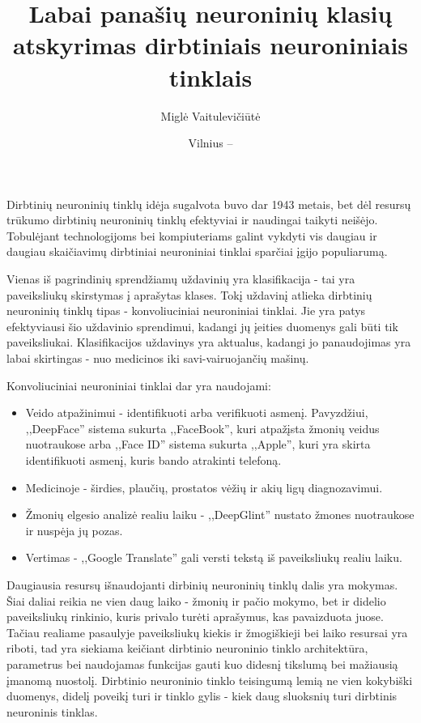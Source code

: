 \documentclass{VUMIFPSkursinis}
\title{Labai panašių neuroninių klasių atskyrimas dirbtiniais neuroniniais tinklais}
\author{Miglė Vaitulevičiūtė}
\date{Vilnius – \the\year}
\begin{document}
	
\maketitle
\cleardoublepage{}
\setcounter{page}{2}

\tableofcontents

Dirbtinių neuroninių tinklų idėja sugalvota buvo dar 1943 metais, bet dėl resursų trūkumo dirbtinių neuroninių tinklų efektyviai ir naudingai taikyti neišėjo. 
Tobulėjant technologijoms bei kompiuteriams galint vykdyti vis daugiau ir daugiau skaičiavimų dirbtiniai neuroniniai tinklai sparčiai įgijo populiarumą.

Vienas iš pagrindinių sprendžiamų uždavinių yra klasifikacija - tai yra paveiksliukų skirstymas į aprašytas klases. Tokį uždavinį atlieka dirbtinių neuroninių 
tinklų tipas - konvoliuciniai neuroniniai tinklai. Jie yra patys efektyviausi šio uždavinio sprendimui, kadangi jų įeities duomenys gali būti tik paveiksliukai.
Klasifikacijos uždavinys yra aktualus, kadangi jo panaudojimas yra labai skirtingas - nuo medicinos iki savi-vairuojančių mašinų.

Konvoliuciniai neuroniniai tinklai dar yra naudojami:
\begin{itemize}
\item Veido atpažinimui - identifikuoti arba verifikuoti asmenį. Pavyzdžiui, ,,DeepFace'' sistema sukurta ,,FaceBook'', kuri atpažįsta žmonių veidus nuotraukose 
arba ,,Face ID'' sistema sukurta ,,Apple'', kuri yra skirta identifikuoti asmenį, kuris bando atrakinti telefoną. 
\item Medicinoje - širdies, plaučių, prostatos vėžių ir akių ligų diagnozavimui.
\item Žmonių elgesio analizė realiu laiku - ,,DeepGlint'' nustato žmones nuotraukose ir nuspėja jų pozas.
\item Vertimas - ,,Google Translate'' gali versti tekstą iš paveiksliukų realiu laiku.
\end{itemize}

Daugiausia resursų išnaudojanti dirbinių neuroninių tinklų dalis yra mokymas. Šiai daliai reikia ne vien daug laiko - žmonių ir pačio mokymo, bet ir didelio 
paveiksliukų rinkinio, kuris privalo turėti aprašymus, kas pavaizduota juose. Tačiau realiame pasaulyje paveiksliukų kiekis ir žmogiškieji bei laiko resursai yra riboti, 
tad yra siekiama keičiant dirbtinio neuroninio tinklo architektūra, parametrus bei naudojamas funkcijas gauti kuo didesnį tikslumą bei mažiausią įmanomą nuostolį. 
Dirbtinio neuroninio tinklo teisingumą lemią ne vien kokybiški duomenys, didelį poveikį turi ir tinklo gylis - kiek daug sluoksnių turi dirbtinis neuroninis 
tinklas. 
\end{document}
